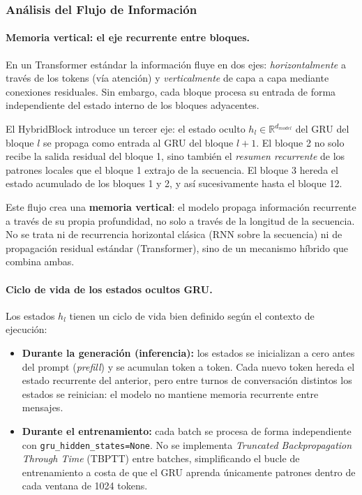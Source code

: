\subsubsection{Análisis del Flujo de Información}

\paragraph{Memoria vertical: el eje recurrente entre bloques.}
En un Transformer estándar la información fluye en dos ejes: \textit{horizontalmente} a través de los tokens (vía atención) y \textit{verticalmente} de capa a capa mediante conexiones residuales. Sin embargo, cada bloque procesa su entrada de forma independiente del estado interno de los bloques adyacentes.

El HybridBlock introduce un tercer eje: el estado oculto $h_l \in \mathbb{R}^{d_{model}}$ del GRU del bloque $l$ se propaga como entrada al GRU del bloque $l+1$. El bloque 2 no solo recibe la salida residual del bloque 1, sino también el \textit{resumen recurrente} de los patrones locales que el bloque 1 extrajo de la secuencia. El bloque 3 hereda el estado acumulado de los bloques 1 y 2, y así sucesivamente hasta el bloque 12.

Este flujo crea una \textbf{memoria vertical}: el modelo propaga información recurrente a través de su propia profundidad, no solo a través de la longitud de la secuencia. No se trata ni de recurrencia horizontal clásica (RNN sobre la secuencia) ni de propagación residual estándar (Transformer), sino de un mecanismo híbrido que combina ambas.

\paragraph{Ciclo de vida de los estados ocultos GRU.}
Los estados $h_l$ tienen un ciclo de vida bien definido según el contexto de ejecución:

\begin{itemize}
    \item \textbf{Durante la generación (inferencia):} los estados se inicializan a cero antes del prompt (\textit{prefill}) y se acumulan token a token. Cada nuevo token hereda el estado recurrente del anterior, pero entre turnos de conversación distintos los estados se reinician: el modelo no mantiene memoria recurrente entre mensajes.
    \item \textbf{Durante el entrenamiento:} cada batch se procesa de forma independiente con \texttt{gru\_hidden\_states=None}. No se implementa \textit{Truncated Backpropagation Through Time} (TBPTT) entre batches, simplificando el bucle de entrenamiento a costa de que el GRU aprenda únicamente patrones dentro de cada ventana de 1024 tokens.
\end{itemize}

